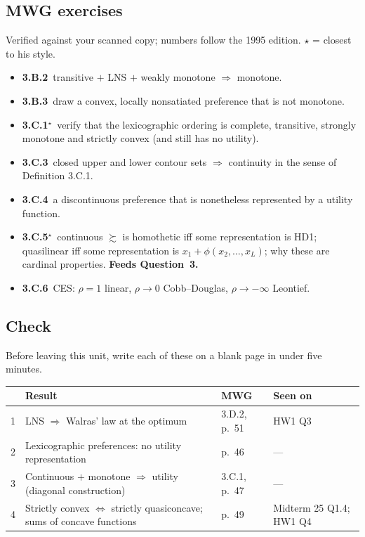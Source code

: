 \documentclass[11pt]{article}
\newcommand{\pref}{\succsim}
\begin{document}
\subsection{MWG exercises}
\begin{todo}{Verified against your scanned copy; numbers follow the 1995 edition. $\star$ = closest to his style.}
\begin{itemize}
\item \textbf{3.B.2}\ transitive $+$ LNS $+$ weakly monotone $\Rightarrow$ monotone.
\item \textbf{3.B.3}\ draw a convex, locally nonsatiated preference that is not monotone.
\item \textbf{3.C.1}$^\star$\ verify that the lexicographic ordering is complete, transitive, strongly monotone and strictly convex (and still has no utility).
\item \textbf{3.C.3}\ closed upper and lower contour sets $\Rightarrow$ continuity in the sense of Definition 3.C.1.
\item \textbf{3.C.4}\ a discontinuous preference that is nonetheless represented by a utility function.
\item \textbf{3.C.5}$^\star$\ continuous $\pref$ is homothetic iff some representation is HD1; quasilinear iff some representation is $x_1+\phi(x_2,\dots,x_L)$; why these are cardinal properties. \textbf{Feeds Question~3.}
\item \textbf{3.C.6}\ CES: $\rho=1$ linear, $\rho\to0$ Cobb--Douglas, $\rho\to-\infty$ Leontief.
\end{itemize}
\end{todo}
\subsection{Check}
Before leaving this unit, write each of these on a blank page in under five minutes.
\begin{center}\small\begin{tabular}{rp{7.4cm}p{3.3cm}p{3.1cm}}\toprule & Result & MWG & Seen on\\\midrule
1 & LNS $\Rightarrow$ Walras' law at the optimum & 3.D.2, p.~51 & HW1 Q3\\
2 & Lexicographic preferences: no utility representation & p.~46 & ---\\
3 & Continuous $+$ monotone $\Rightarrow$ utility (diagonal construction) & 3.C.1, p.~47 & ---\\
4 & Strictly convex $\iff$ strictly quasiconcave; sums of concave functions & p.~49 & Midterm 25 Q1.4; HW1 Q4\\
\bottomrule\end{tabular}\end{center}
\end{document}
